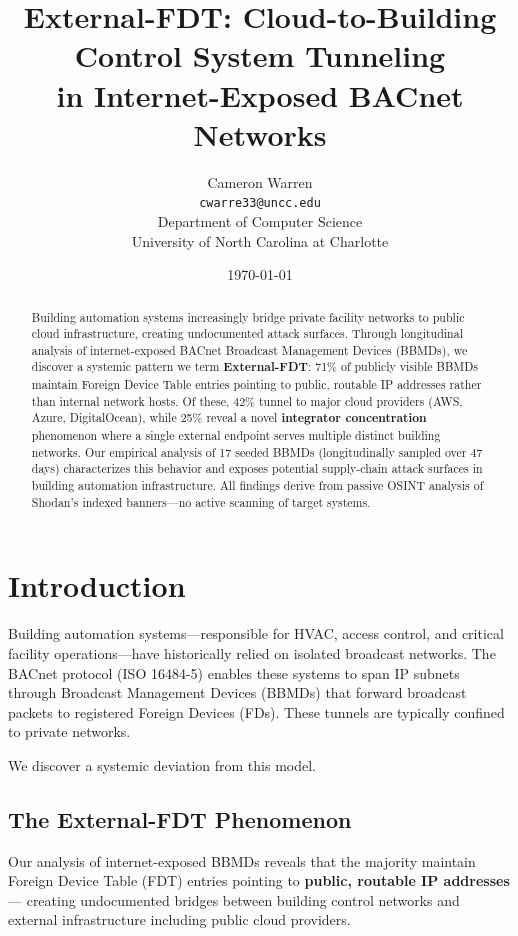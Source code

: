\documentclass[11pt,a4paper]{article}
\title{\textbf{External-FDT}: Cloud-to-Building Control System Tunneling\\
       in Internet-Exposed BACnet Networks}
\author{Cameron Warren\\
  \texttt{cwarre33@uncc.edu}\\[0.5em]
  Department of Computer Science\\
  University of North Carolina at Charlotte
}
\date{\today}
\begin{document}
\maketitle

\begin{abstract}
Building automation systems increasingly bridge private facility networks to public 
cloud infrastructure, creating undocumented attack surfaces. Through longitudinal 
analysis of internet-exposed BACnet Broadcast Management Devices (BBMDs), we 
discover a systemic pattern we term \textbf{External-FDT}: 71\% of publicly visible 
BBMDs maintain Foreign Device Table entries pointing to public, routable IP addresses 
rather than internal network hosts. Of these, 42\% tunnel to major cloud providers 
(AWS, Azure, DigitalOcean), while 25\% reveal a novel \textbf{integrator concentration} 
phenomenon where a single external endpoint serves multiple distinct building 
networks. Our empirical analysis of 17 seeded BBMDs (longitudinally sampled over 
47 days) characterizes this behavior and exposes potential supply-chain attack 
surfaces in building automation infrastructure. All findings derive from passive 
OSINT analysis of Shodan's indexed banners---no active scanning of target systems.
\end{abstract}

\section{Introduction}
\label{sec:intro}

Building automation systems---responsible for HVAC, access control, and 
critical facility operations---have historically relied on isolated 
broadcast networks. The BACnet protocol (ISO 16484-5) enables these systems 
to span IP subnets through Broadcast Management Devices (BBMDs) that forward 
broadcast packets to registered Foreign Devices (FDs). These tunnels are 
typically confined to private networks.

We discover a systemic deviation from this model.

\subsection{The External-FDT Phenomenon}

Our analysis of internet-exposed BBMDs reveals that the majority maintain 
Foreign Device Table (FDT) entries pointing to \textbf{public, routable IP addresses}---
creating undocumented bridges between building control networks and external 
infrastructure including public cloud providers.
\end{document}

